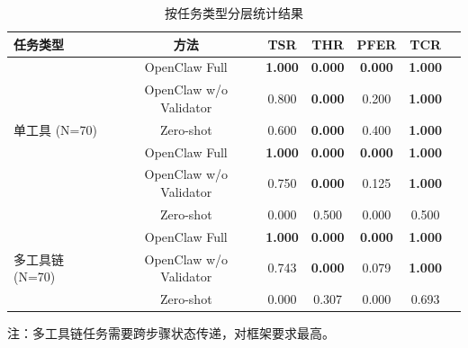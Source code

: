 \begin{table}[htbp]
\centering
\caption{按任务类型分层统计结果}
\label{tab:layered_results}
\begin{tabular}{lcccccc}
\toprule
\textbf{任务类型} & \textbf{方法} & \textbf{TSR} & \textbf{THR} & \textbf{PFER} & \textbf{TCR} \\
\midrule
\multirow{5}{*}{单工具 (N=70)} 
& OpenClaw Full & \textbf{1.000} & \textbf{0.000} & \textbf{0.000} & \textbf{1.000} \\
& OpenClaw w/o Validator & 0.800 & \textbf{0.000} & 0.200 & \textbf{1.000} \\
& Zero-shot & 0.600 & \textbf{0.000} & 0.400 & \textbf{1.000} \\
\cmidrule{2-6}
\multirow{5}{*}{双工具 (N=60)} 
& OpenClaw Full & \textbf{1.000} & \textbf{0.000} & \textbf{0.000} & \textbf{1.000} \\
& OpenClaw w/o Validator & 0.750 & \textbf{0.000} & 0.125 & \textbf{1.000} \\
& Zero-shot & 0.000 & 0.500 & 0.000 & 0.500 \\
\cmidrule{2-6}
\multirow{5}{*}{多工具链 (N=70)} 
& OpenClaw Full & \textbf{1.000} & \textbf{0.000} & \textbf{0.000} & \textbf{1.000} \\
& OpenClaw w/o Validator & 0.743 & \textbf{0.000} & 0.079 & \textbf{1.000} \\
& Zero-shot & 0.000 & 0.307 & 0.000 & 0.693 \\
\bottomrule
\end{tabular}
\begin{tablenotes}
\small
\item 注：多工具链任务需要跨步骤状态传递，对框架要求最高。
\end{tablenotes}
\end{table}
